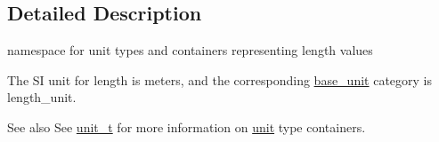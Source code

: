 \subsection{Detailed Description}
namespace for unit types and containers representing length values 

The S\+I unit for length is {\ttfamily meters}, and the corresponding {\ttfamily \hyperlink{structunits_1_1base__unit}{base\+\_\+unit}} category is {\ttfamily length\+\_\+unit}. \begin{DoxySeeAlso}{See also}
See \hyperlink{classunits_1_1unit__t}{unit\+\_\+t} for more information on \hyperlink{structunits_1_1unit}{unit} type containers. 
\end{DoxySeeAlso}
